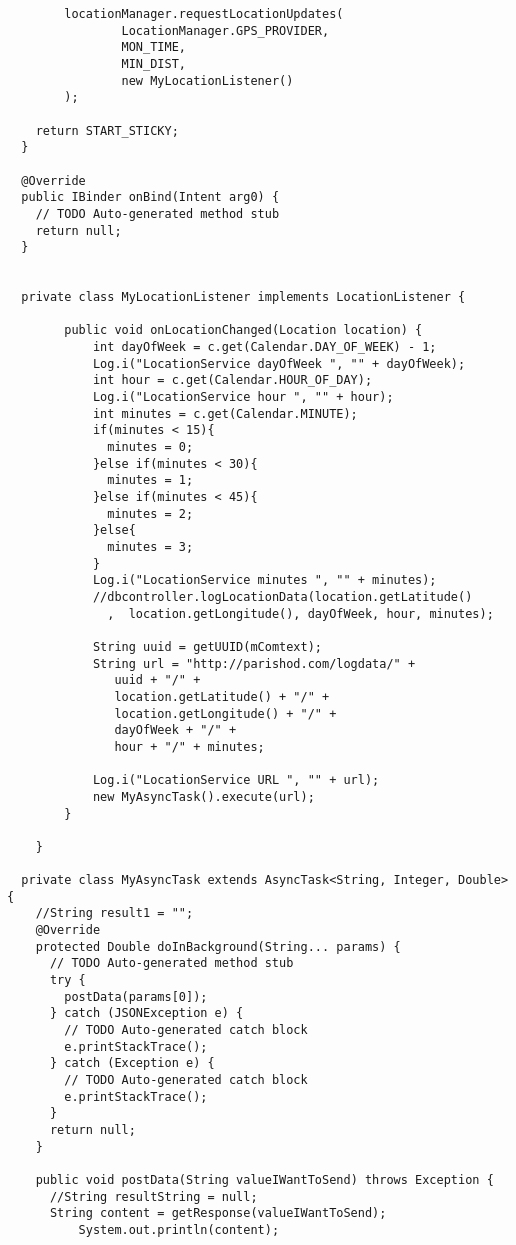 \documentclass[conference]{IEEEtran}
\begin{document}
\begin{lstlisting}
        locationManager.requestLocationUpdates(
                LocationManager.GPS_PROVIDER, 
                MON_TIME, 
                MIN_DIST,
                new MyLocationListener()
        );
        
    return START_STICKY;
  }
  
  @Override
  public IBinder onBind(Intent arg0) {
    // TODO Auto-generated method stub
    return null;
  }
  
  
  private class MyLocationListener implements LocationListener {

        public void onLocationChanged(Location location) {
            int dayOfWeek = c.get(Calendar.DAY_OF_WEEK) - 1;
            Log.i("LocationService dayOfWeek ", "" + dayOfWeek);
            int hour = c.get(Calendar.HOUR_OF_DAY);
            Log.i("LocationService hour ", "" + hour);
            int minutes = c.get(Calendar.MINUTE);
            if(minutes < 15){
              minutes = 0;
            }else if(minutes < 30){
              minutes = 1;
            }else if(minutes < 45){
              minutes = 2;              
            }else{
              minutes = 3;
            }
            Log.i("LocationService minutes ", "" + minutes);
            //dbcontroller.logLocationData(location.getLatitude()
              ,  location.getLongitude(), dayOfWeek, hour, minutes);
            
            String uuid = getUUID(mComtext);
            String url = "http://parishod.com/logdata/" +
               uuid + "/" + 
               location.getLatitude() + "/" + 
               location.getLongitude() + "/" + 
               dayOfWeek + "/" + 
               hour + "/" + minutes;
           
            Log.i("LocationService URL ", "" + url);
            new MyAsyncTask().execute(url);
        }

    }
  
  private class MyAsyncTask extends AsyncTask<String, Integer, Double>{
    //String result1 = "";
    @Override
    protected Double doInBackground(String... params) {
      // TODO Auto-generated method stub
      try {
        postData(params[0]);
      } catch (JSONException e) {
        // TODO Auto-generated catch block
        e.printStackTrace();
      } catch (Exception e) {
        // TODO Auto-generated catch block
        e.printStackTrace();
      }
      return null;
    }

    public void postData(String valueIWantToSend) throws Exception {
      //String resultString = null;
      String content = getResponse(valueIWantToSend);
          System.out.println(content);
          

\end{lstlisting}
\end{document}
